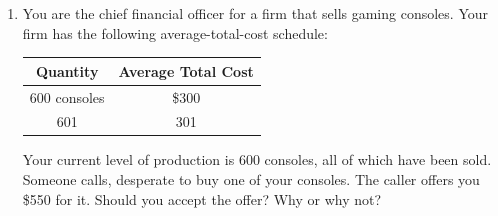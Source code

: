 \documentclass{article}
\begin{document}
\begin{enumerate}
	\begin{enumerate}
	
	\item Fill in the column of marginal products. What pattern do you see? How might you explain it?
	
	\item A worker costs \$100 a day, and the firm has fixed costs of \$200. Use this information to fill in the column for total cost.
	
	\item Fill in the column for average total cost. What pattern do you see?
	
	\item Now fill in the column for marginal cost. What pattern do you see?
	
	\item Compare the column for marginal product with the column for marginal cost. Explain the relationship.
	
	\item Compare the column for average total cost with the column for marginal cost. Explain the relationship.
	
	\end{enumerate}
	
\item You are the chief financial officer for a firm that sells gaming consoles. Your firm has the following average-total-cost schedule:

	\begin{center}
	\begin{tabular}{ | c | c |}
	\hline
	Quantity & Average Total Cost\\
	\hline
	600 consoles & \$300 \\
	\hline
	601 & 301\\
	\hline
	\end{tabular}
	\end{center}
	
	Your current level of production is 600 consoles, all of which have been sold. Someone calls, desperate to buy one of your consoles. The caller offers you \$550 for it. Should you accept the offer? Why or why not?

\end{enumerate}
\end{document}
